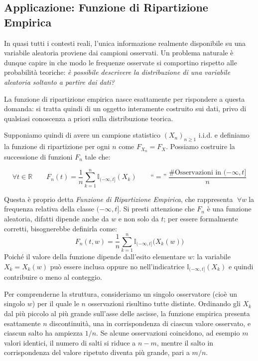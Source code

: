 \subsection{Applicazione: Funzione di Ripartizione Empirica}
In quasi tutti i contesti reali, l’unica informazione realmente disponibile su una variabile aleatoria proviene dai campioni osservati. Un problema naturale è dunque capire in che modo le frequenze osservate si comportino rispetto alle probabilità teoriche: \textit{è possibile descrivere la distribuzione di una variabile aleatoria soltanto a partire dai dati?}

\medskip
La funzione di ripartizione empirica nasce esattamente per rispondere a questa domanda: si tratta quindi di un oggetto interamente costruito sui dati, privo di qualsiasi conoscenza a priori sulla distribuzione teorica.


\bigskip
\noindent Supponiamo quindi di avere un campione statistico $(X_n)_{n\geq1}$ i.i.d. e definiamo la funzione di ripartizione per ogni $n$ come $F_{X_n} = F_X$. Possiamo costruire la successione di funzioni $F_n$ tale che:

\[\forall t\in\mathbb R\qquad F_n(t) = \frac{1}{n}\sum_{k=1}^n \mathbb{I}_{(-\infty, t]}(X_k)\qquad \text{``}=\text{''}\; \frac{\text{\# Osservazioni in } (-\infty, t]}{n}\]

Questa è proprio detta \textit{Funzione di Ripartizione Empirica}, che rappresenta $\;\forall w\;$la frequenza relativa della classe $(-\infty, t]$.  Si presti attenzione che $F_n$ è una funzione aleatoria, difatti dipende anche da $w$ e non solo da $t$; per essere formalmente corretti, bisognerebbe definirla come:
\[\boxed{F_n(t, w) = \frac{1}{n}\sum_{k=1}^n \mathbb{I}_{(-\infty, t]}\bigl(X_k(w)\bigr)}\]
Poiché il valore della funzione dipende dall’esito elementare $w$: la variabile
$X_k = X_k(w)$ può essere inclusa oppure no nell’indicatrice
$\mathbb{I}_{(-\infty, t]}(X_k)$ e quindi contribuire o meno al conteggio.

\medskip
Per comprenderne la struttura, consideriamo un singolo osservatore (cioè un
singolo $w$) per il quale le $n$ osservazioni risultino tutte distinte.
Ordinando gli $X_k$ dal più piccolo al più grande sull’asse delle ascisse, la
funzione empirica presenta esattamente $n$ discontinuità, una in
corrispondenza di ciascun valore osservato, e ciascun salto ha ampiezza $1/n$. Se alcune osservazioni coincidono, ad esempio $m$ valori identici, il numero di
salti si riduce a $n-m$, mentre il salto in corrispondenza del valore ripetuto
diventa più grande, pari a $m/n$.

